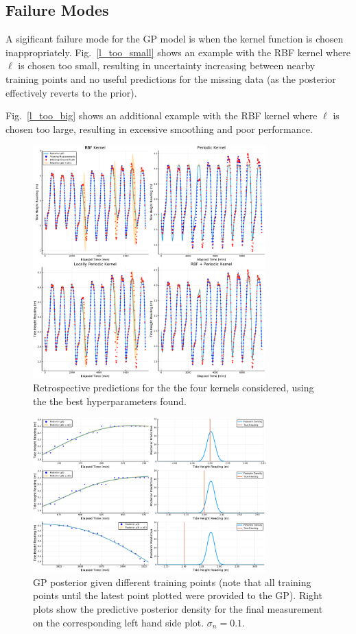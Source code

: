 \documentclass[a4paper, twocolumn, 10pt]{article}
\begin{document}
\begin{appendices}
\section{Failure Modes}
\label{sec_failure}
A sigificant failure mode for the GP model is when the kernel function is chosen inappropriately. Fig.~\ref{l_too_small} shows an example with the RBF kernel where $\ell$ is chosen too small, resulting in uncertainty increasing between nearby training points and no useful predictions for the missing data (as the posterior effectively reverts to the prior). 

Fig.~\ref{l_too_big} shows an additional example with the RBF kernel where $\ell$ is chosen too large, resulting in excessive smoothing and poor performance. 

\begin{figure}
	\includegraphics[width=0.8\textwidth]{main_summary}
	\centering
	\caption{\label{main_summary}Retrospective predictions for the the four kernels considered, using the the best hyperparameters found.}
\end{figure}

\begin{figure}
	\includegraphics[width=0.8\textwidth]{badcal}
	\centering
	\caption{\label{badcal}GP posterior given different training points (note that all training points until the latest point plotted were provided to the GP). Right plots show the predictive posterior density for the final measurement on the corresponding left hand side plot. $\sigma_n = 0.1$. }
\end{figure}


\end{appendices}
\end{document}
